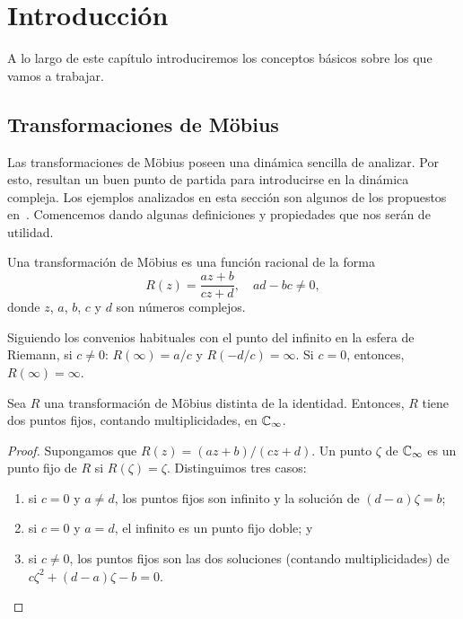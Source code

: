 \chapter{Introducción}

A lo largo de este capítulo introduciremos los conceptos básicos sobre los que
vamos a trabajar.

\section{Transformaciones de Möbius}

Las transformaciones de Möbius poseen una dinámica sencilla de analizar. Por
esto, resultan un buen punto de partida para introducirse en la dinámica
compleja. Los ejemplos analizados en esta sección son algunos de los propuestos
en~\cite{Beardon1991}. Comencemos dando algunas definiciones y propiedades que
nos serán de utilidad.

\begin{definicion}
  Una transformación de Möbius es una función racional de la forma
  \begin{equation*}
    R(z) = \frac{az + b}{cz + d}, \quad ad-bc \neq 0,
  \end{equation*}
  donde $z$, $a$, $b$, $c$ y $d$ son números complejos.
\end{definicion}

Siguiendo los convenios habituales con el punto del infinito en la esfera de
Riemann, si $c \neq 0$: $R(\infty) = a/c$ y $R(-d/c) = \infty$. Si $c = 0$,
entonces, $R(\infty) = \infty$.

\begin{proposicion}
  Sea $R$ una transformación de Möbius distinta de la identidad. Entonces, $R$
  tiene dos puntos fijos, contando multiplicidades, en $\mathbb{C}_\infty$.
\end{proposicion}
\begin{proof}
  Supongamos que $R(z) = (az + b)/(cz + d)$. Un punto $\zeta$ de $\mathbb{C}_\infty$ es un
  punto fijo de $R$ si $R(\zeta) = \zeta$. Distinguimos tres casos:
  \begin{enumerate}[label=(\roman*)]
    \item si $c = 0$ y $a \neq d$, los puntos fijos son infinito y la solución
          de $(d-a)\zeta = b$; \label{itm:mobius_inf_fijo}
    \item si $c = 0$ y $a = d$, el infinito es un punto fijo doble; y
          \label{itm:mobius_inf_fijo_doble}
    \item si $c \neq 0$, los puntos fijos son las dos soluciones (contando
          multiplicidades) de $c\zeta^2 + (d - a)\zeta - b = 0$.\qedhere
  \end{enumerate}
\end{proof}

